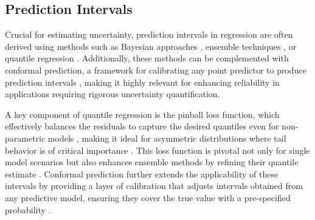 \documentclass{article}
\begin{document}
\subsection{Prediction Intervals}

Crucial for estimating uncertainty, prediction intervals in regression are often derived using methods such as Bayesian approaches \cite{williams1995gaussian,hensman2015scalable,gal2016dropoutbnn}, ensemble techniques \cite{breiman2001random,lakshminarayanan2017simple, malinin2021uncertainty}, or quantile regression \cite{Koenker1978, koenker2001qr}. Additionally, these methods can be complemented with conformal prediction, a framework for calibrating any point predictor to produce prediction intervals \cite{vovk2005algorithmic, vovk2022conformal}, making it highly relevant for enhancing reliability in applications requiring rigorous uncertainty quantification.

A key component of quantile regression is the pinball loss function, which effectively balances the residuals to capture the desired quantiles even for non-parametric models \cite{steinwart2011estimating}, making it ideal for asymmetric distributions where tail behavior is of critical importance \cite{koenker2001qr}. This loss function is pivotal not only for single model scenarios but also enhances ensemble methods by refining their quantile estimate \cite{meinshausen2006quantile}. Conformal prediction further extends the applicability of these intervals by providing a layer of calibration that adjusts intervals obtained from any predictive model, ensuring they cover the true value with a pre-specified probability \cite{romano2019cqr}. 
\end{document}
